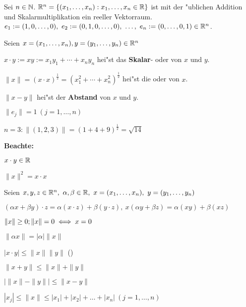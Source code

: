\documentclass[a4paper,twoside,DIV15,BCOR12mm,chapterprefix=true,headings=twolinechapter]{scrbook}
\begin{document}
Sei $n\in\mathbb{N}$. $\mathbb{R}^n=\{(x_1, \ldots, x_n) : x_1,\ldots, x_n \in \mathbb{R}\}$ ist mit der "ublichen Addition und Skalarmultiplikation ein reeller Vektorraum.\\
$e_1:=(1,0,\ldots,0),\ e_2:=(0,1,0,\ldots, 0),\ \ldots,\ e_n:=(0,\ldots,0,1) \in \mathbb{R}^n$.

\begin{definition}
Seien $x=(x_1, \ldots, x_n), y=(y_1, \ldots, y_n) \in \mathbb{R}^n$
\begin{liste}
\item $x\cdot y := xy := x_1y_1+\cdots+x_ny_n$ hei"st das \textbf{Skalar}- oder  von $x$ und $y$.
\item $\|x\|=(x\cdot x)^\frac{1}{2} = (x_1^2 + \cdots + x_n^2)^\frac{1}{2}$ hei"st die  oder  von $x$.
\item {}$\|x-y\|$ hei"st der \textbf{Abstand} von $x$ und $y$.
\end{liste}
\end{definition}

\begin{beispiele}
\item $\|e_j\|=1\ (j=1,\dots,n)$
\item $n=3: \|(1,2,3)\|=(1+4+9)^{\frac{1}{2}}=\sqrt{14}$
\end{beispiele}

\textbf{Beachte: }
\begin{liste}
\item $x \cdot y \in \mathbb{R}$
\item $\|x\|^2=x \cdot x$
\end{liste}

\begin{satz}
Seien $x,y,z \in \mathbb{R}^n,\ \alpha, \beta \in \mathbb{R},\ x=(x_1, \ldots, x_n),\ y=(y_1, \ldots, y_n)$
\begin{liste}
\item $(\alpha x + \beta y)\cdot z=\alpha(x\cdot z)+\beta(y \cdot z),\ x(\alpha y + \beta z)=\alpha(xy)+\beta(xz)$
\item $\|x\|\ge 0; \|x\|=0\iff x=0$
\item $\|\alpha x\|=|\alpha|\|x\|$
\item $|x \cdot y|\le\|x\| \|y\|$  ()
\item $\|x+y\|\le\|x\|+\|y\|$
\item ${\left|\|x\|-\|y\|\right|}\le \|x-y\|$
\item $|x_j|\le\|x\|\le |x_1|+|x_2|+\ldots+|x_n|\ (j=1,\ldots,n)$
\end{liste}
\end{satz}
\end{document}
